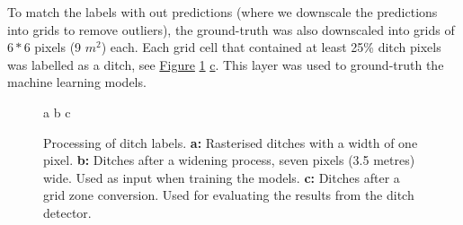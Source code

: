 \documentclass[11pt, review]{elsarticle} %
\begin{document}
To match the labels with out predictions (where we downscale the predictions into grids to remove outliers), the ground-truth was also downscaled into grids of $6*6$ pixels (9 $m^2$) each. Each grid cell that contained at least 25\% ditch pixels was labelled as a ditch, see \hyperref[fig:ditchpreprocess]{Figure} \ref{fig:ditchpreprocess} \hyperref[fig:ditchpreprocess]{c}. This layer was used to ground-truth the machine learning models.

\begin{figure} [!htb]
    \centering
    a{
        }\hspace{5pt}
    b{
        }
    c{
        }
    \caption{Processing of ditch labels. \textbf{a: }Rasterised ditches with a width of one pixel. \textbf{b: }Ditches after a widening process, seven pixels (3.5 metres) wide. Used as input when training the models. \textbf{c: }Ditches after a grid zone conversion. Used for evaluating the results from the ditch detector.} \label{sample-figure}
    \label{fig:ditchpreprocess}
\end{figure}
\end{document}
